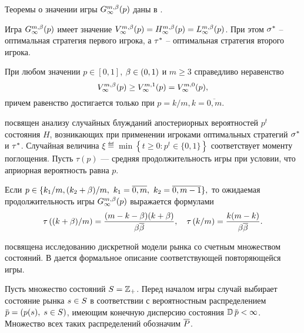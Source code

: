 Теоремы о значении игры $\theG*{\infty}(p)$ даны в .
\begin{theorem}
  Игра $\theG*{\infty}(p)$ имеет значение $\V*{\infty}(p) = \H*{\infty}(p) = \L*{\infty}(p)$.
  При этом $\sigma^*$ -- оптимальная стратегия первого игрока\textup{,} а $\tau^*$ -- оптимальная стратегия второго игрока.
\end{theorem}

\begin{theorem}
  При любом значении $p \in [0,1]$, $\beta \in (0,1)$ и $m \geq 3$ справедливо неравенство
  \begin{equation*}
    \V*[\Co]{\infty}(p) \geq \V*[1]{\infty}(p) = \V*[0]{\infty}(p),
  \end{equation*}
  причем равенство достигается только при $p = k/m, k = \overline{0,m}$.
\end{theorem}

 посвящен анализу случайных блужданий апостериорных вероятностей $p^t$ состояния $H$, возникающих при применении игроками оптимальных стратегий $\sigma^*$ и $\tau^*$.
Случайная величина
$
  \xi \eqdef \min \left\{ t \geq 0: p^t \in \{0, 1\} \right\}
$
соответствует моменту поглощения.
Пусть $\tau(p)$ --- средняя продолжительность игры при условии, что априорная вероятность равна $p$.

\begin{theorem}
  Если $p \in \{k_1/m, (k_2+\beta)/m,\ k_1 = \overline{0,m},\ k_2 = \overline{0,m-1}\},$ то ожидаемая продолжительность игры $\theG*{\infty}(p)$ выражается формулами
  \begin{equation*} 
    \tau\left( (k+\beta)/m \right) = \frac{(m-k-\beta)(k+\beta)}{\beta {{\overline{\beta}}}},\quad
    \tau\left( k/m \right) = \frac{k(m-k)}{\beta {{\overline{\beta}}}}.
  \end{equation*}
\end{theorem}

 посвящена исследованию дискретной модели рынка со счетным множеством состояний.
В  дается формальное описание соответствующей повторяющейся игры.

Пусть множество состояний $S = \mathbb{Z}_+$.
Перед началом игры случай выбирает состояние рынка $s \in S$ в соответствии с вероятностным распределением $\pd = (\pc{s}, \; s \in S)$, имеющим конечную дисперсию состояния $\D \pd < \infty$.
Множество всех таких распределений обозначим $\overline{P}$.

